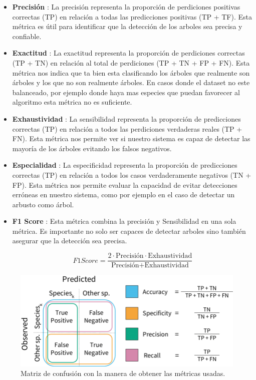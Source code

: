 \begin{itemize}
    \item \textbf{Precisión} : La precisión representa la proporción de perdiciones positivas correctas (TP) en relación a todas las predicciones positivas (TP + TF). Esta métrica es útil para identificar que la detección de los arboles sea precisa y confiable.

    \item \textbf{Exactitud} : La exactitud representa la proporción de perdiciones correctas (TP + TN) en relación al total de perdiciones  (TP + TN + FP + FN). Esta métrica nos indica que ta bien esta clasificando los árboles que realmente son árboles y los que no son realmente árboles. En casos donde el dataset no este balanceado, por ejemplo donde haya mas especies que puedan favorecer al algoritmo esta métrica no es suficiente. 

    \item \textbf{Exhaustividad} : La sensibilidad representa la proporción de predicciones correctas (TP) en relación a todos las perdiciones verdaderas reales (TP + FN). Esta métrica nos permite ver si nuestro sistema es capaz de detectar las mayoría de los árboles evitando los falsos negativos.

    \item \textbf{Especialidad} : La especificidad representa la proporción de predicciones correctas (TP) en relación a todos los casos verdaderamente negativos (TN + FP). Esta métrica nos permite evaluar la capacidad de evitar detecciones erróneas en nuestro sistema, como por ejemplo en el caso de detectar un arbusto como árbol.

    \item \textbf{F1 Score} : Esta métrica combina la precisión y Sensibilidad en una sola métrica. Es importante no solo ser capaces de detectar arboles sino también asegurar que la detección sea precisa.
    
    \[ F1 Score = \frac{2 \cdot \text{Precisión} \cdot \text{Exhaustividad}}{\text{Precisión} + \text{Exhaustividad}} \]

\end{itemize}

\begin{figure}[h]
\centering
    \includegraphics[width=13cm]{imaxes/Model-performance-metrics-Visual-representation-of-the-classification-model-metrics.png}
    \caption{Matriz de confusión con la manera de obtener las métricas usadas.\cite{imgConf}}
    \label{fig:confmatrix}
\end{figure}


